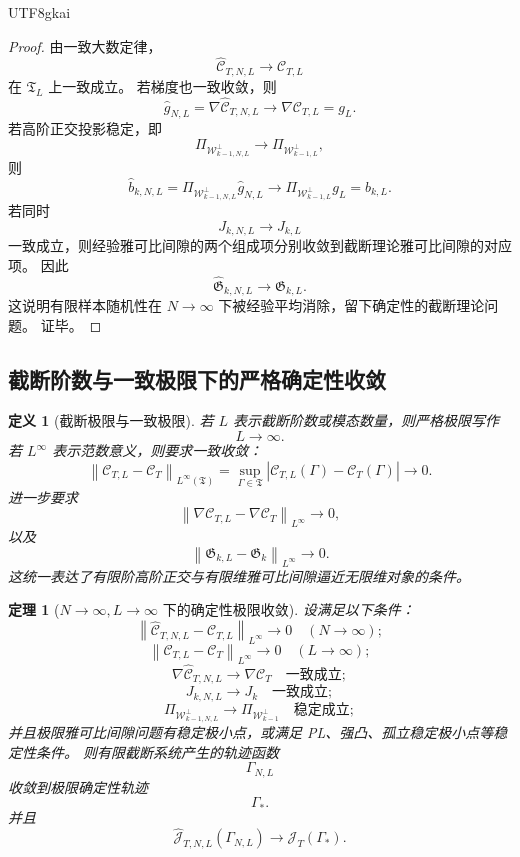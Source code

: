 \documentclass[12pt]{article}
\newtheorem{definition}{定义}[section]
\newtheorem{theorem}{定理}[section]
\begin{document}
\begin{CJK*}{UTF8}{gkai}
\begin{proof}
由一致大数定律，
\[
  \widehat{\mathcal C}_{T,N,L}
  \to
  \mathcal C_{T,L}
\]
在 \(\mathfrak T_L\) 上一致成立。
若梯度也一致收敛，则
\[
  \widehat g_{N,L}
  =
  \nabla\widehat{\mathcal C}_{T,N,L}
  \to
  \nabla\mathcal C_{T,L}
  =
  g_L.
\]
若高阶正交投影稳定，即
\[
  \Pi_{\mathcal W_{k-1,N,L}^{\perp}}
  \to
  \Pi_{\mathcal W_{k-1,L}^{\perp}},
\]
则
\[
  \widehat b_{k,N,L}
  =
  \Pi_{\mathcal W_{k-1,N,L}^{\perp}}
  \widehat g_{N,L}
  \to
  \Pi_{\mathcal W_{k-1,L}^{\perp}}g_L
  =
  b_{k,L}.
\]
若同时
\[
  J_{k,N,L}\to J_{k,L}
\]
一致成立，则经验雅可比间隙的两个组成项分别收敛到截断理论雅可比间隙的对应项。
因此
\[
  \widehat{\mathfrak G}_{k,N,L}
  \to
  \mathfrak G_{k,L}.
\]
这说明有限样本随机性在 \(N\to\infty\) 下被经验平均消除，留下确定性的截断理论问题。
证毕。
\end{proof}

\subsection{截断阶数与一致极限下的严格确定性收敛}
\label{subsec:tex55-engdet-L-limit}

\begin{definition}[截断极限与一致极限]
\label{def:tex55-engdet-L-infty}
若 \(L\) 表示截断阶数或模态数量，则严格极限写作
\[
  L\to\infty.
\]
若 \(L^\infty\) 表示范数意义，则要求一致收敛：
\[
  \left\lVert
  \mathcal C_{T,L}-\mathcal C_T
  \right\rVert_{L^\infty(\mathfrak T)}
  =
  \sup_{\Gamma\in\mathfrak T}
  \left|
  \mathcal C_{T,L}(\Gamma)-\mathcal C_T(\Gamma)
  \right|
  \to0.
\]
进一步要求
\[
  \left\lVert
  \nabla\mathcal C_{T,L}-\nabla\mathcal C_T
  \right\rVert_{L^\infty}
  \to0,
\]
以及
\[
  \left\lVert
  \mathfrak G_{k,L}-\mathfrak G_k
  \right\rVert_{L^\infty}
  \to0.
\]
这统一表达了有限阶高阶正交与有限维雅可比间隙逼近无限维对象的条件。
\end{definition}

\begin{theorem}[\(N\to\infty,L\to\infty\) 下的确定性极限收敛]
\label{thm:tex55-engdet-deterministic-limit}
设满足以下条件：
\[
  \left\lVert
  \widehat{\mathcal C}_{T,N,L}
  -
  \mathcal C_{T,L}
  \right\rVert_{L^\infty}
  \to0
  \quad(N\to\infty);
\]
\[
  \left\lVert
  \mathcal C_{T,L}
  -
  \mathcal C_T
  \right\rVert_{L^\infty}
  \to0
  \quad(L\to\infty);
\]
\[
  \nabla\widehat{\mathcal C}_{T,N,L}
  \to
  \nabla\mathcal C_T
  \quad\text{一致成立};
\]
\[
  J_{k,N,L}\to J_k
  \quad\text{一致成立};
\]
\[
  \Pi_{\mathcal W_{k-1,N,L}^{\perp}}
  \to
  \Pi_{\mathcal W_{k-1}^{\perp}}
  \quad\text{稳定成立};
\]
并且极限雅可比间隙问题有稳定极小点，或满足 PL、强凸、孤立稳定极小点等稳定性条件。
则有限截断系统产生的轨迹函数
\[
  \Gamma_{N,L}
\]
收敛到极限确定性轨迹
\[
  \Gamma_*.
\]
并且
\[
  \widehat{\mathcal J}_{T,N,L}(\Gamma_{N,L})
  \to
  \mathcal J_T(\Gamma_*).
\]
\end{theorem}


\end{CJK*}
\end{document}
